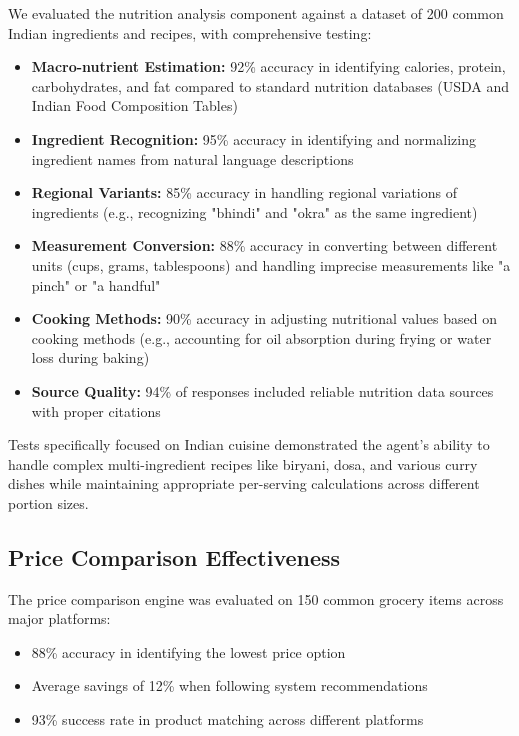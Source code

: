 \documentclass{ecai}
\begin{document}
We evaluated the nutrition analysis component against a dataset of 200 common Indian ingredients and recipes, with comprehensive testing:

\begin{itemize}[noitemsep,topsep=0pt]
    \item \textbf{Macro-nutrient Estimation:} 92\% accuracy in identifying calories, protein, carbohydrates, and fat compared to standard nutrition databases (USDA and Indian Food Composition Tables)
    \item \textbf{Ingredient Recognition:} 95\% accuracy in identifying and normalizing ingredient names from natural language descriptions
    \item \textbf{Regional Variants:} 85\% accuracy in handling regional variations of ingredients (e.g., recognizing "bhindi" and "okra" as the same ingredient)
    \item \textbf{Measurement Conversion:} 88\% accuracy in converting between different units (cups, grams, tablespoons) and handling imprecise measurements like "a pinch" or "a handful"
    \item \textbf{Cooking Methods:} 90\% accuracy in adjusting nutritional values based on cooking methods (e.g., accounting for oil absorption during frying or water loss during baking)
    \item \textbf{Source Quality:} 94\% of responses included reliable nutrition data sources with proper citations
\end{itemize}

Tests specifically focused on Indian cuisine demonstrated the agent's ability to handle complex multi-ingredient recipes like biryani, dosa, and various curry dishes while maintaining appropriate per-serving calculations across different portion sizes.

\subsection{Price Comparison Effectiveness}

The price comparison engine was evaluated on 150 common grocery items across major platforms:
\begin{itemize}[noitemsep,topsep=0pt]
    \item 88\% accuracy in identifying the lowest price option
    \item Average savings of 12\% when following system recommendations
    \item 93\% success rate in product matching across different platforms
\end{itemize}
\end{document}
